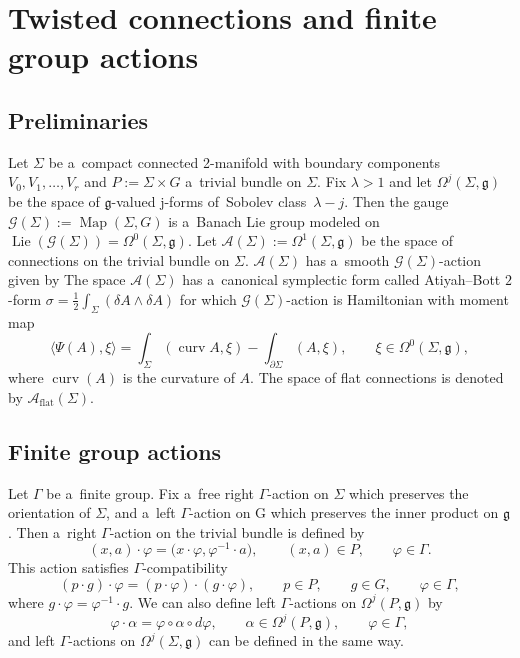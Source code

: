 \documentclass[10pt,a4paper]{amsart}
\numberwithin{equation}{section}
\theoremstyle{definition}
\newcommand{\Map}{\operatorname{Map}}
\newcommand{\Lie}{\operatorname{Lie}}
\newcommand{\curv}{\operatorname{curv}}
\begin{document}
\section{Twisted connections and finite group actions}\label{5Tw_conn_and_fin_grp_act}

\subsection{Preliminaries}
Let $\Sigma$ be a~compact connected 2-manifold with boundary components $V_0, V_1, \dots, V_{r}$ and $P := \Sigma \times G$ a~trivial bundle on $\Sigma$.
Fix $\lambda > 1$ and let $\Omega^{j}(\Sigma,\mathfrak{g})$ be the space of $\mathfrak{g}$-valued j-forms of~Sobolev class~${\lambda-j}$.
Then the gauge $\mathcal{G}(\Sigma) := \Map(\Sigma,G)$ is a~Banach Lie group modeled on $\Lie(\mathcal{G}(\Sigma)) = \Omega^{0}(\Sigma,\mathfrak{g})$.
Let $\mathcal{A}(\Sigma) := \Omega^{1}(\Sigma,\mathfrak{g})$ be the space of connections on the trivial bundle on $\Sigma$.
$\mathcal{A}(\Sigma)$ has a~smooth $\mathcal{G}(\Sigma)$-action given by
The space $\mathcal{A}(\Sigma)$ has a~canonical symplectic form called Atiyah--Bott $2$-form
$\sigma = \frac{1}{2} \int_{\Sigma} (\delta A\wedge \delta A )$
for which $\mathcal{G}(\Sigma)$-action is Hamiltonian with moment map
\[\langle \Psi(A), \xi\rangle = \int_{\Sigma} (\curv A,\xi) - \int _{\partial \Sigma} (A,\xi), \qquad \xi \in \Omega^{0}(\Sigma,\mathfrak{g}),
\]
where $\curv(A) $ is the curvature of $A$.
The space of flat connections is denoted by $\mathcal{A}_{\mathrm{flat}}(\Sigma)$.

\subsection{Finite group actions}
Let $\Gamma$ be a~finite group.
Fix a~free right $\Gamma$-action on $\Sigma$ which preserves the orientation of $\Sigma$, and a~left $\Gamma$-action on G which preserves the inner product on $\mathfrak{g}$.
Then a~right $\Gamma$-action on the trivial bundle is defined by
\[(x,a) \cdot \varphi = \bigl(x\cdot \varphi, \varphi ^{-1} \cdot a\bigr) ,\qquad (x,a) \in P,\qquad \varphi \in \Gamma.\]
This action satisfies $\Gamma$-compatibility
\[ (p\cdot g)\cdot \varphi = (p \cdot \varphi)\cdot (g \cdot \varphi), \qquad p \in P,\qquad g \in G,\qquad \varphi \in \Gamma,
\]
where $g\cdot \varphi = \varphi^{-1} \cdot g$.
We can also define left $\Gamma$-actions on $\Omega^{j}(P,\mathfrak{g})$ by
\[
\varphi \cdot \alpha = \varphi \circ \alpha \circ d\varphi , \qquad \alpha \in \Omega^{j}(P,\mathfrak{g}),\qquad \varphi \in \Gamma,
\]
and left $\Gamma$-actions on $\Omega^{j}(\Sigma,\mathfrak{g})$ can be defined in the same way.
\end{document}
